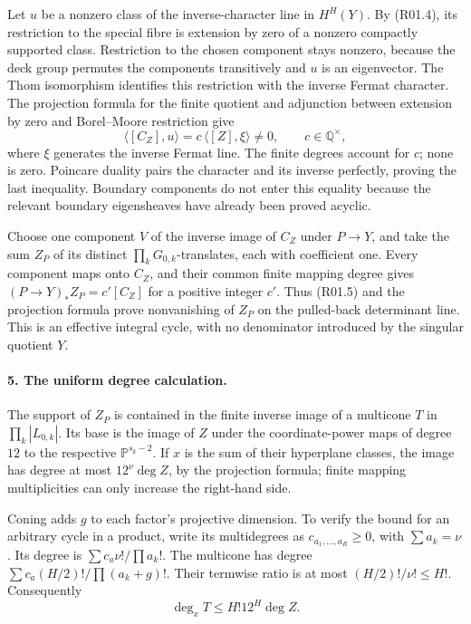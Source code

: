 Let $u$ be a nonzero class of the inverse-character line in $H^H(Y)$.
By (R01.4), its restriction to the special fibre is extension by zero
of a nonzero compactly supported class. Restriction to the chosen
component stays nonzero, because the deck group permutes the components
transitively and $u$ is an eigenvector. The Thom isomorphism identifies
this restriction with the inverse Fermat character. The projection
formula for the finite quotient and adjunction between extension by
zero and Borel--Moore restriction give
\[
       \langle[C_Z],u\rangle
           =c\,\langle[Z],\xi\rangle\ne0,
             \qquad c\in\mathbb Q^\times,             \tag{R01.5}
\]
where $\xi$ generates the inverse Fermat line. The finite degrees
account for $c$; none is zero. Poincare duality pairs the character
and its inverse perfectly, proving the last inequality. Boundary
components do not enter this equality because the relevant boundary
eigensheaves have already been proved acyclic.

Choose one component $V$ of the inverse image of $C_Z$ under
$P\to Y$, and take the sum $Z_P$ of its distinct
$\prod_kG_{0,k}$-translates, each with coefficient one. Every
component maps onto $C_Z$, and their common finite mapping degree
gives $(P\to Y)_*Z_P=c'[C_Z]$ for a positive integer $c'$.
Thus (R01.5) and the projection formula prove nonvanishing of
$Z_P$ on the pulled-back determinant line. This is an effective
integral cycle, with no denominator introduced by the singular
quotient $Y$.

\paragraph{5. The uniform degree calculation.}
The support of $Z_P$ is contained in the finite inverse image of
a multicone $T$ in $\prod_k|L_{0,k}|$. Its base is the image of
$Z$ under the coordinate-power maps of degree $12$ to the respective
$\mathbb P^{s_k-2}$. If $x$ is the sum of their hyperplane classes,
the image has degree at most $12^\nu\deg Z$, by the projection
formula; finite mapping multiplicities can only increase the
right-hand side.

Coning adds $g$ to each factor's projective dimension. To verify
the bound for an arbitrary cycle in a product, write its multidegrees
as $c_{a_1,\ldots,a_R}\ge0$, with $\sum a_k=\nu$. Its degree is
$\sum c_a\nu!/\prod a_k!$. The multicone has degree
$\sum c_a(H/2)!/\prod(a_k+g)!$.
Their termwise ratio is at most $(H/2)!/\nu!\le H!$.
Consequently
\[
                  \deg_x T\le H!12^H\deg Z.          \tag{R01.6}
\]


